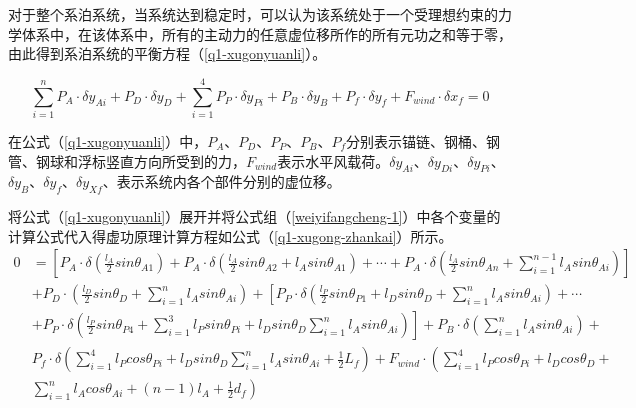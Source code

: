 \documentclass[withoutpreface,bwprint]{cumcmthesis} %
\begin{document}
\par 对于整个系泊系统，当系统达到稳定时，可以认为该系统处于一个受理想约束的力学体系中，在该体系中，所有的主动力的任意虚位移所作的所有元功之和等于零，由此得到系泊系统的平衡方程（\ref{q1-xugonyuanli}）。

\begin{equation}
	\label{q1-xugonyuanli}
	\sum\limits_{i=1}^{n} P_A \cdot \delta y_{Ai} + P_D\cdot \delta y_D + \sum\limits_{i=1}^{4}P_P\cdot \delta y_{Pi} + P_B \cdot \delta y_{B} + P_f \cdot \delta y_{f} + F_{wind} \cdot \delta x_f = 0
\end{equation}

\par 在公式（\ref{q1-xugonyuanli}）中，$P_A$、$P_D$、$P_P$、$P_B$、$P_f$分别表示锚链、钢桶、钢管、钢球和浮标竖直方向所受到的力，$F_{wind}$表示水平风载荷。$\delta y_{Ai}$、$\delta y_{Di}$、$\delta y_{Pi}$、$\delta y_{B}$、$\delta y_{f}$、$\delta y_{Xf}$、表示系统内各个部件分别的虚位移。
\par 将公式（\ref{q1-xugonyuanli}）展开并将公式组（\ref{weiyifangcheng-1}）中各个变量的计算公式代入得虚功原理计算方程如公式（\ref{q1-xugong-zhankai}）所示。
\begin{equation}
	\label{q1-xugong-zhankai}
	\begin{split}
		0 &= \left[ P_A \cdot \delta(\frac{l_A}{2}sin \theta_{A1}) + P_A \cdot \delta(\frac{l_A}{2}sin \theta_{A2} + l_A sin \theta_{A1}) + \cdots +P_A \cdot \delta(\frac{l_A}{2}sin \theta_{An} + \sum\limits_{i=1}^{n-1} l_A sin \theta_{Ai}) \right] \\ 
		& + P_D \cdot (\frac{l_D}{2}sin \theta_{D} + \sum\limits_{i=1}^{n}l_A sin \theta_{Ai}) + \left[ {P_P \cdot \delta(\frac{l_P}{2}sin \theta_{P1} + l_D sin \theta_D + \sum\limits_{i=1}^{n}l_A sin\theta_{Ai} ) + \cdots} \right. \\
		& \left. {+ P_P \cdot \delta(\frac{l_P}{2}sin \theta_{P4} + \sum\limits_{i=1}^{3} l_P sin \theta_{Pi} +l_D sin \theta_D \sum\limits_{i=1}^{n}l_A sin\theta_{Ai} )} \right] + P_B \cdot \delta (\sum\limits_{i=1}^{n} l_A sin \theta_{Ai}) + \\
		& P_f \cdot \delta (\sum\limits_{i=1}^{4}l_P cos\theta_{Pi} + l_D sin \theta_{D} \sum\limits_{i=1}^{n}l_A sin \theta_{Ai} + \frac{1}{2}L_f) + F_{wind} \cdot \left({\sum\limits_{i=1}^{4}l_P cos \theta_{Pi} + l_D cos \theta_D +} \right. \\
		& \left. {\sum\limits_{i=1}^{n}l_A cos \theta_{Ai} + (n-1)l_A + \frac{1}{2} d_f} \right)
	\end{split}
\end{equation}
\end{document}
